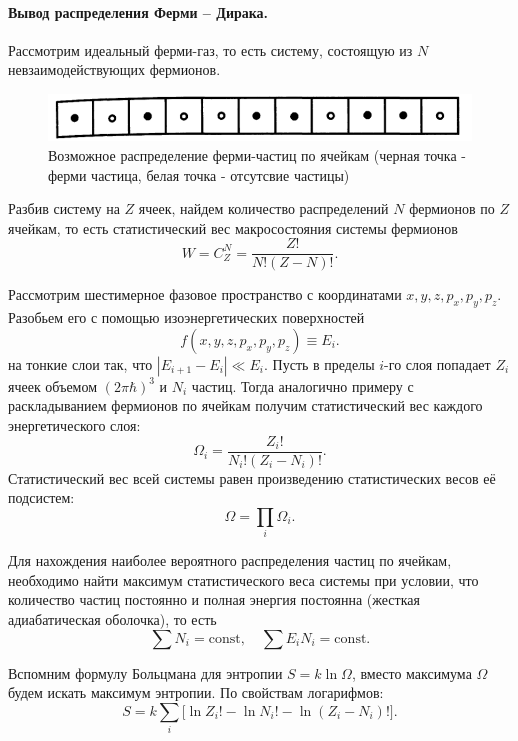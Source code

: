 \paragraph{Вывод распределения Ферми -- Дирака.}
Рассмотрим идеальный ферми-газ, то есть систему, состоящую из $N$ невзаимодействующих фермионов.
\begin{figure}[H]
	\centering
	\includegraphics[width=0.7\linewidth]{img/write-05/yacheiki}
	\caption{Возможное распределение ферми-частиц по ячейкам (черная точка - ферми частица, белая точка - отсутсвие частицы)}
	\label{fig:yacheiki}
\end{figure}
Разбив систему на $Z$ ячеек, найдем количество распределений $N$ фермионов по $Z$ ячейкам, то есть статистический вес макросостояния системы фермионов
\begin{equation*}
	W = C_Z^N = \frac{Z!}{N!(Z-N)!}.
\end{equation*}

Рассмотрим шестимерное фазовое пространство с координатами $x,y,z,p_x,p_y,p_z$. Разобьем его с помощью изоэнергетических поверхностей
\begin{equation*}
	f(x,y,z,p_x,p_y,p_z) \equiv E_i.
\end{equation*}
на тонкие слои так, что $|E_{i+1}-E_{i}|\ll E_i$. Пусть в пределы $i$-го слоя попадает $Z_i$ ячеек объемом $(2\pi\hbar)^3$ и $N_i$ частиц. Тогда аналогично примеру с раскладыванием фермионов по ячейкам получим статистический вес каждого энергетического слоя:
\begin{equation*}
	\Omega_i = \frac{Z_i!}{N_i!(Z_i-N_i)!}.
\end{equation*}
Статистический вес всей системы равен произведению статистических весов её подсистем:
\begin{equation*}
	\Omega = \prod_i \Omega_i.
\end{equation*}

Для нахождения наиболее вероятного распределения частиц по ячейкам, необходимо найти максимум статистического веса системы при условии, что количество частиц постоянно и полная энергия постоянна (жесткая адиабатическая оболочка), то есть
\begin{equation*}
	\sum N_i=\mathrm{const},\quad \sum E_iN_i=\mathrm{const}.
\end{equation*}

Вспомним формулу Больцмана для энтропии $S=k\ln \Omega$, вместо максимума $\Omega$ будем искать максимум энтропии. По свойствам логарифмов:
\begin{equation*}
	S=k\sum_i \big[\ln Z_i! - \ln N_i ! - \ln(Z_i - N_i)!\big].
\end{equation*}

